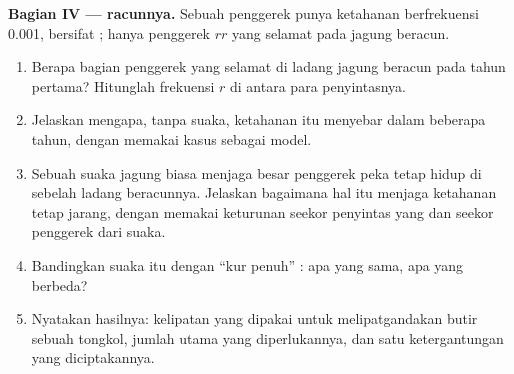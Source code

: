 \begin{problem}
\medskip
\noindent\textbf{Bagian IV ---  racunnya.}
Sebuah  penggerek punya  ketahanan berfrekuensi 0.001,
bersifat ; hanya penggerek $rr$ yang selamat pada jagung beracun.
\begin{enumerate}[resume]
  \item Berapa bagian penggerek yang selamat di ladang jagung beracun
        pada tahun pertama? Hitunglah frekuensi $r$ di antara para
        penyintasnya.
  \item Jelaskan mengapa, tanpa suaka, ketahanan itu menyebar dalam
        beberapa tahun, dengan memakai kasus  sebagai model.
  \item Sebuah suaka jagung biasa menjaga  besar penggerek
        peka tetap hidup di sebelah ladang beracunnya. Jelaskan
        bagaimana hal itu menjaga  ketahanan tetap jarang, dengan
        memakai  keturunan seekor penyintas yang  dan
        seekor penggerek dari suaka.
  \item Bandingkan suaka itu dengan ``kur penuh'' : apa yang
        sama, apa yang berbeda?
  \item Nyatakan hasilnya: kelipatan yang dipakai  untuk
        melipatgandakan butir sebuah tongkol, jumlah  utama yang
        diperlukannya, dan satu ketergantungan yang diciptakannya.
\end{enumerate}
\end{problem}
